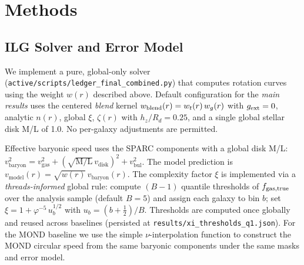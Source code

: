 \documentclass[12pt,a4paper]{article}
\begin{document}
\section{Methods}

\subsection{ILG Solver and Error Model}

We implement a pure, global-only solver (\texttt{active/scripts/ledger\_final\_combined.py}) that computes rotation curves using the weight $w(r)$ described above. Default configuration for the \emph{main results} uses the centered \emph{blend} kernel $w_{\rm blend}(r)=w_t(r)\,w_g(r)$ with $g_{\rm ext}=0$, analytic $n(r)$, global $\xi$, $\zeta(r)$ with $h_z/R_d=0.25$, and a single global stellar disk M/L of 1.0. No per-galaxy adjustments are permitted.

Effective baryonic speed uses the SPARC components with a global disk M/L: $v_\mathrm{baryon}^2 = v_\mathrm{gas}^2 + (\sqrt{\mathrm{M/L}}\,v_\mathrm{disk})^2 + v_\mathrm{bul}^2$. The model prediction is $v_\mathrm{model}(r) = \sqrt{w(r)}\, v_\mathrm{baryon}(r)$. The complexity factor $\xi$ is implemented via a \emph{threads-informed} global rule: compute $(B{-}1)$ quantile thresholds of $f_{\rm gas,true}$ over the analysis sample (default $B{=}5$) and assign each galaxy to bin $b$; set $\xi=1+\varphi^{-5}\,u_b^{1/2}$ with $u_b=(b+\tfrac{1}{2})/B$. Thresholds are computed once globally and reused across baselines (persisted at \texttt{results/xi\_thresholds\_q1.json}).
For the MOND baseline we use the simple $\nu$-interpolation function to construct the MOND circular speed from the same baryonic components under the same masks and error model.
\end{document}
